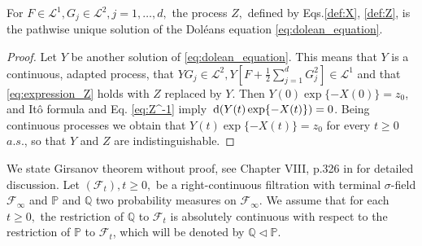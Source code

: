 \begin{proposition}
	For $F \in \mathcal{L}^{1}, G_{j} \in \mathcal{L}^{2}, j=1, \ldots, d,$ the process $Z,$ defined by Eqs.\eqref{def:X}, \eqref{def:Z}, is the pathwise unique solution of the Doléans equation \eqref{eq:dolean_equation}.
\end{proposition}

\begin{proof}
	Let $Y$ be another solution of \eqref{eq:dolean_equation}. This means that $Y$ is a continuous, adapted process, that $Y G_{j} \in \mathcal{L}^{2}, Y\left[F+\frac{1}{2} \sum_{j=1}^{d} G_{j}^{2}\right] \in \mathcal{L}^{1}$ and that \eqref{eq:expression_Z} holds with $Z$ replaced by $Y$. Then $Y(0) \exp \{-X(0)\}=z_{0}$, and Itô formula and Eq. \eqref{eq:Z^-1} imply $\,\mathrm{d} (Y(t) \exp \{-X(t)\})=0$. Being continuous processes we obtain that $Y(t) \exp \{-X(t)\}=z_{0}$ for every $t \geq 0$ $a.s.$, so that $Y$ and $Z$ are indistinguishable.
\end{proof}


%
We state Girsanov theorem without proof, see Chapter VIII, p.326 in \cite{revuz2013continuous} for detailed discussion. Let $\left(\mathcal{F}_{t}\right), t \geq 0,$ be a right-continuous filtration with terminal $\sigma$-field $\mathcal{F}_{\infty}$ and $\mathbb{P}$ and $\mathbb{Q}$ two probability measures on $\mathcal{F}_{\infty} .$ We assume that for each $t \geq 0,$ the restriction of $\mathbb{Q}$ to $\mathcal{F}_{t}$ is absolutely continuous with respect to the restriction of $\mathbb{P}$ to $\mathcal{F}_{t}$, which will be denoted by $\mathbb{Q} \lhd \mathbb{P}$.


